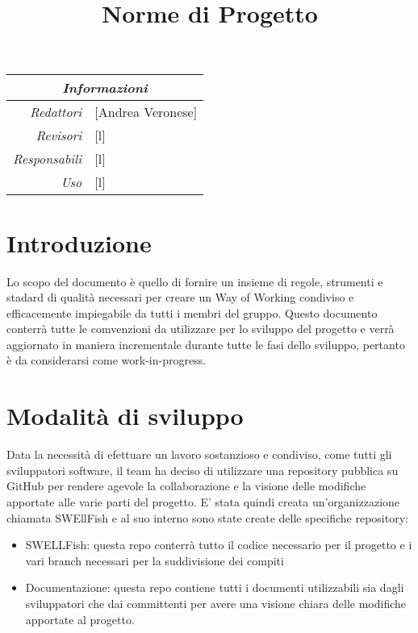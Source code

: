 \documentclass[12pt]{article}
\begin{document}
\graphicspath{ {../templates/img/} }



\title{Norme di Progetto}
\firstPage


\maketitle
\begin{center}
    \begin{tabular}{r | l}
		\multicolumn{2}{c}{\textit{Informazioni}}\\
		\hline
		
			\textit{Redattori} &
			[Andrea Veronese]\makecell{}\\
		
			\textit{Revisori} &
			[l]\makecell{}\\
			\textit{Responsabili} &
			[l]\makecell{}\\
		      \textit{Uso} & 
                [l]\makecell{}\\
\end{tabular}
\end{center}


\tableofcontents
\printindex 
\section{Introduzione}
Lo scopo del documento è quello di fornire un insieme di regole, strumenti e stadard di qualità necessari per creare un Way of Working condiviso e efficacemente impiegabile da tutti i membri del gruppo.
Questo documento conterrà tutte le comvenzioni da utilizzare per lo sviluppo del progetto e verrà aggiornato in maniera incrementale durante tutte le fasi dello sviluppo, pertanto è da considerarsi come work-in-progress.


\section{Modalità di sviluppo}
Data la necessità di efettuare un lavoro sostanzioso e condiviso, come tutti gli sviluppatori software, il team ha deciso di utilizzare una repository pubblica su GitHub per rendere agevole la collaborazione e la visione delle modifiche apportate alle varie parti del progetto.
E' stata quindi creata un'organizzazione chiamata SWEllFish e al suo interno sono state create delle specifiche repository:

\begin{itemize}
    \item SWELLFish: questa repo conterrà tutto il codice necessario per il progetto e i vari branch necessari per la suddivisione dei compiti
    \item Documentazione: questa repo contiene tutti i documenti utilizzabili sia dagli sviluppatori che dai committenti per avere una visione chiara delle modifiche apportate al progetto.
\end{itemize}
\end{document}
